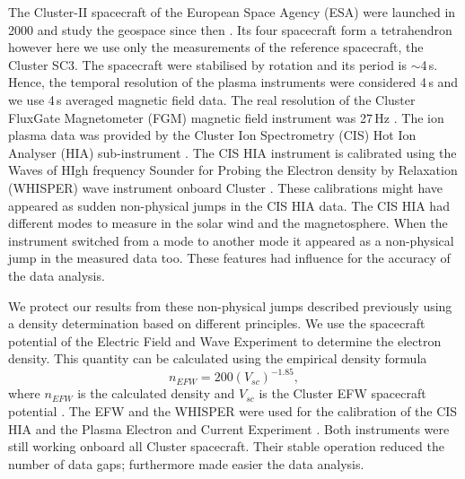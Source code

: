 \documentclass[linenumbers,draft]{agujournal}
\begin{document}
The Cluster-II spacecraft of the European Space Agency (ESA) were launched in 2000 and study the geospace since then \citep{credland97:_clust_mission,escoubet01:_introd_clust}. Its four spacecraft form a tetrahendron however here we use only the measurements of the reference spacecraft, the Cluster SC3. The spacecraft were stabilised by rotation and its period is $\sim$4\,s. Hence, the temporal resolution of the plasma instruments were considered 4\,s and we use 4\,s averaged magnetic field data. The real resolution of the Cluster FluxGate Magnetometer (FGM) magnetic field instrument was 27\,Hz \citep{balogh97:_clust_magnet_field_inves,balogh01:_clust_magnet_field_inves}. The ion plasma data was provided by the Cluster Ion Spectrometry (CIS) Hot Ion Analyser (HIA) sub-instrument \citep{reme97:_clust_ion_spect_exper,reme01:_first_earth_clust_cis}. The CIS HIA instrument is calibrated using the Waves of HIgh frequency Sounder for Probing the Electron density by Relaxation (WHISPER) wave instrument onboard Cluster \citep{decreau01:_early_whisp_clust,trotignon10:_whisp_relax_sound_clust_activ_archiv,blagau13:_in_hot_ion_analy_clust,blagau14:_in_hot_ion_analy_clust}. These calibrations might have appeared as sudden non-physical jumps in the CIS HIA data. The CIS HIA had different modes to measure in the solar wind and the magnetosphere. When the instrument switched from a mode to another mode it appeared as a non-physical jump in the measured data too. These features had influence for the accuracy of the data analysis.

We protect our results from these non-physical jumps described previously using a density determination based on different principles. We use the spacecraft potential of the Electric Field and Wave Experiment \citep[EFW ;][]{gustafsson97:_elect_field_wave_exper_clust_mission,gustafsson01:_first_clust_efw} to determine the electron density. This quantity can be calculated using the empirical density formula 
\begin{equation}\label{eq:empdens}
n_{EFW}=200(V_{sc})^{-1.85},
\end{equation}
where $n_{EFW}$ is the calculated density and $V_{sc}$ is the Cluster EFW spacecraft potential \citep{trotignon10:_whisp_relax_sound_clust_activ_archiv,trotignon11:_calib_repor_whisp_measur_clust}. The EFW and the WHISPER were used for the calibration of the CIS HIA and the Plasma Electron and Current Experiment \citep[PEACE;][]{johnstone97:_peace,fazakerley10:_peace_data_clust_activ_archiv,fazakerley10:_clust_peace_in_calib_status}. Both instruments were still working onboard all Cluster spacecraft. Their stable operation reduced the number of data gaps; furthermore made easier the data analysis.
\end{document}

